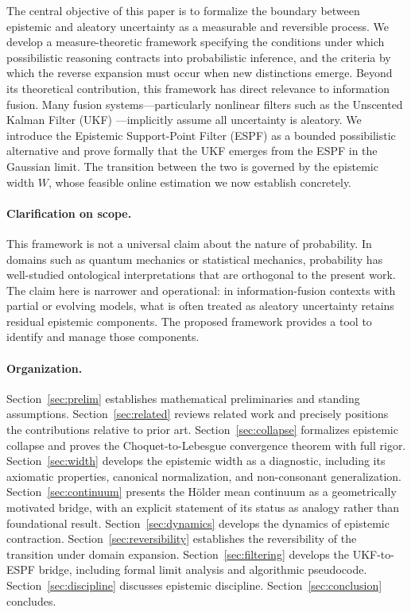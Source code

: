 \documentclass[12pt]{article}
\begin{document}
The central objective of this paper is to formalize the boundary between
epistemic and aleatory uncertainty as a measurable and reversible process.
We develop a measure-theoretic framework specifying the conditions under which
possibilistic reasoning contracts into probabilistic inference, and the criteria
by which the reverse expansion must occur when new distinctions emerge.
Beyond its theoretical contribution, this framework has direct relevance to
information fusion.
Many fusion systems---particularly nonlinear filters such as the
Unscented Kalman Filter (UKF) \cite{julier1997}---implicitly assume all
uncertainty is aleatory.
We introduce the Epistemic Support-Point Filter (ESPF) \cite{jah2025espf} as a
bounded possibilistic alternative and prove formally that the UKF emerges from
the ESPF in the Gaussian limit.
The transition between the two is governed by the epistemic width $W$, whose
feasible online estimation we now establish concretely.

\paragraph{Clarification on scope.}
This framework is not a universal claim about the nature of probability.
In domains such as quantum mechanics or statistical mechanics, probability
has well-studied ontological interpretations that are orthogonal to the
present work.
The claim here is narrower and operational: in information-fusion contexts
with partial or evolving models, what is often treated as aleatory uncertainty
retains residual epistemic components.
The proposed framework provides a tool to identify and manage those components.

\paragraph{Organization.}
Section~\ref{sec:prelim} establishes mathematical preliminaries and standing
assumptions.
Section~\ref{sec:related} reviews related work and precisely positions the
contributions relative to prior art.
Section~\ref{sec:collapse} formalizes epistemic collapse and proves the
Choquet-to-Lebesgue convergence theorem with full rigor.
Section~\ref{sec:width} develops the epistemic width as a diagnostic, including
its axiomatic properties, canonical normalization, and non-consonant
generalization.
Section~\ref{sec:continuum} presents the H\"older mean continuum as a
geometrically motivated bridge, with an explicit statement of its status as
analogy rather than foundational result.
Section~\ref{sec:dynamics} develops the dynamics of epistemic contraction.
Section~\ref{sec:reversibility} establishes the reversibility of the transition
under domain expansion.
Section~\ref{sec:filtering} develops the UKF-to-ESPF bridge, including
formal limit analysis and algorithmic pseudocode.
Section~\ref{sec:discipline} discusses epistemic discipline.
Section~\ref{sec:conclusion} concludes.
\end{document}
